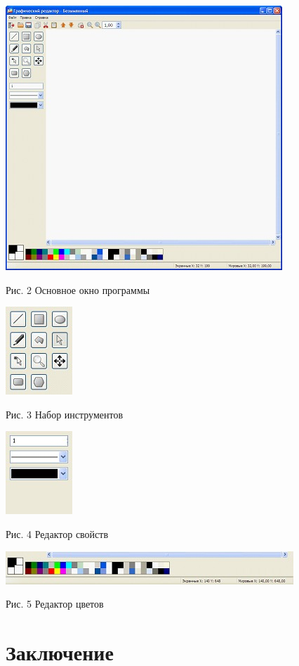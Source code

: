 \documentclass[a4paper,12pt]{article}
\begin{document}
\begin{flushleft}
\includegraphics*[scale = 0.60]{image3.jpg}

	Рис. 2 Основное окно программы

\includegraphics*[scale = 0.60]{image4.jpg}

	Рис. 3 Набор инструментов

\includegraphics*[scale = 0.60]{image5.jpg}

	Рис. 4 Редактор свойств

\includegraphics*[scale = 0.60]{image6.jpg}

	Рис. 5 Редактор цветов
\end{flushleft}


\section{Заключение}
\end{document}
